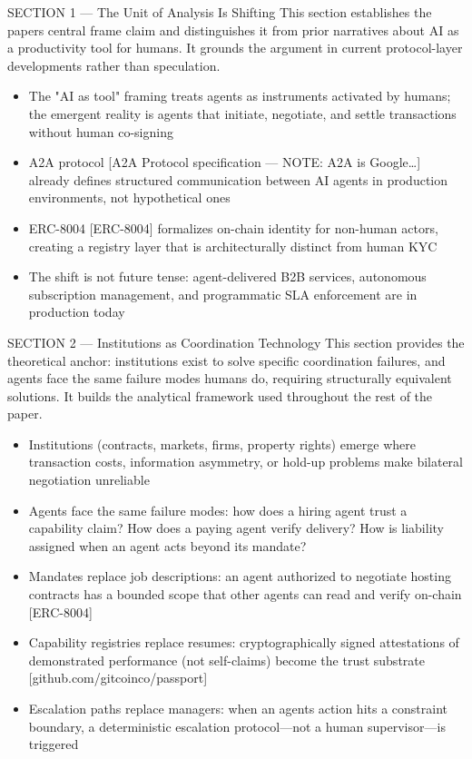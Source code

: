 \documentclass[
]{article}
\providecommand{\tightlist}{%
  \setlength{\itemsep}{0pt}\setlength{\parskip}{0pt}}
\begin{document}
SECTION 1 --- The Unit of Analysis Is Shifting This section establishes
the paper\textquotesingle s central frame claim and distinguishes it
from prior narratives about AI as a productivity tool for humans. It
grounds the argument in current protocol-layer developments rather than
speculation.

\begin{itemize}
\tightlist
\item
  The "AI as tool" framing treats agents as instruments activated by
  humans; the emergent reality is agents that initiate, negotiate, and
  settle transactions without human co-signing
\item
  A2A protocol {[}A2A Protocol specification --- NOTE: A2A is
  Google\ldots{]} already defines structured communication between AI
  agents in production environments, not hypothetical ones
\item
  ERC-8004 {[}ERC-8004{]} formalizes on-chain identity for non-human
  actors, creating a registry layer that is architecturally distinct
  from human KYC
\item
  The shift is not future tense: agent-delivered B2B services,
  autonomous subscription management, and programmatic SLA enforcement
  are in production today
\end{itemize}

SECTION 2 --- Institutions as Coordination Technology This section
provides the theoretical anchor: institutions exist to solve specific
coordination failures, and agents face the same failure modes humans do,
requiring structurally equivalent solutions. It builds the analytical
framework used throughout the rest of the paper.

\begin{itemize}
\tightlist
\item
  Institutions (contracts, markets, firms, property rights) emerge where
  transaction costs, information asymmetry, or hold-up problems make
  bilateral negotiation unreliable
\item
  Agents face the same failure modes: how does a hiring agent trust a
  capability claim? How does a paying agent verify delivery? How is
  liability assigned when an agent acts beyond its mandate?
\item
  Mandates replace job descriptions: an agent authorized to negotiate
  hosting contracts has a bounded scope that other agents can read and
  verify on-chain {[}ERC-8004{]}
\item
  Capability registries replace resumes: cryptographically signed
  attestations of demonstrated performance (not self-claims) become the
  trust substrate {[}github.com/gitcoinco/passport{]}
\item
  Escalation paths replace managers: when an agent\textquotesingle s
  action hits a constraint boundary, a deterministic escalation
  protocol---not a human supervisor---is triggered
\end{itemize}
\end{document}
